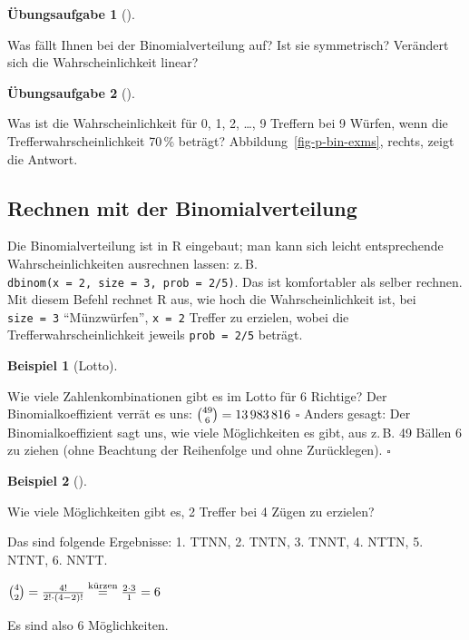 \documentclass[
  ngerman,
  letterpaper,
  twoside,
  open=any]{scrbook}
\theoremstyle{definition}
\newtheorem{example}{Beispiel}[chapter]
\theoremstyle{plain}
\theoremstyle{definition}
\newtheorem{exercise}{Übungsaufgabe}[chapter]
\theoremstyle{definition}
\theoremstyle{definition}
\newtheorem{example}{Beispiel}[chapter]
\theoremstyle{definition}
\newtheorem{exercise}{Übungsaufgabe}[chapter]
\theoremstyle{remark}
\begin{document}
\begin{exercise}[]\protect\hypertarget{exr-binom}{}\label{exr-binom}

️Was fällt Ihnen bei der Binomialverteilung auf? Ist sie symmetrisch?
Verändert sich die Wahrscheinlichkeit linear?

\end{exercise}

\begin{exercise}[]\protect\hypertarget{exr-binom2}{}\label{exr-binom2}

Was ist die Wahrscheinlichkeit für 0, 1, 2, \ldots, 9 Treffern bei 9
Würfen, wenn die Trefferwahrscheinlichkeit 70\,\% beträgt?
Abbildung~\ref{fig-p-bin-exms}, rechts, zeigt die Antwort.

\end{exercise}

\subsection{Rechnen mit der
Binomialverteilung}\label{rechnen-mit-der-binomialverteilung}

Die Binomialverteilung ist in R eingebaut; man kann sich leicht
entsprechende Wahrscheinlichkeiten ausrechnen lassen: z.\,B.
\texttt{dbinom(x\ =\ 2,\ size\ =\ 3,\ prob\ =\ 2/5)}. Das ist
komfortabler als selber rechnen. Mit diesem Befehl rechnet R aus, wie
hoch die Wahrscheinlichkeit ist, bei \texttt{size\ =\ 3}
\enquote{Münzwürfen}, \texttt{x\ =\ 2} Treffer zu erzielen, wobei die
Trefferwahrscheinlichkeit jeweils \texttt{prob\ =\ 2/5} beträgt.

\begin{example}[Lotto]\protect\hypertarget{exm-binkoeff2}{}\label{exm-binkoeff2}

Wie viele Zahlenkombinationen gibt es im Lotto für 6 Richtige? Der
Binomialkoeffizient verrät es uns: \(\tbinom{49}{6}= 13\,983\,816\)
\(\square\) Anders gesagt: Der Binomialkoeffizient sagt uns, wie viele
Möglichkeiten es gibt, aus z.\,B. 49 Bällen 6 zu ziehen (ohne Beachtung
der Reihenfolge und ohne Zurücklegen). \(\square\)

\end{example}

\begin{example}[]\protect\hypertarget{exm-2aus4}{}\label{exm-2aus4}

Wie viele Möglichkeiten gibt es, 2 Treffer bei 4 Zügen zu erzielen?

Das sind folgende Ergebnisse: 1. TTNN, 2. TNTN, 3. TNNT, 4. NTTN, 5.
NTNT, 6. NNTT.

\(\tbinom{4}{2} = \frac{4!}{2! \cdot (4-2)!} \overset{\text{kürzen}}= \frac{2\cdot 3}{1}=6\)

Es sind also 6 Möglichkeiten.

\end{example}
\end{document}
